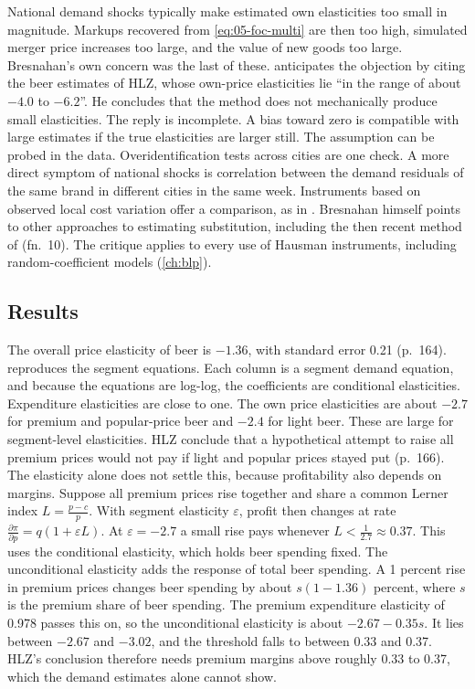 National demand shocks typically make estimated own elasticities too small in magnitude. Markups recovered from
\eqref{eq:05-foc-multi} are then too high, simulated merger price increases too large, and the value of new goods
too large. Bresnahan's own concern was the last of these. \citet[fn.~25]{Hausman1997} anticipates the objection
by citing the beer estimates of HLZ, whose own-price elasticities lie ``in the range of about $-4.0$ to $-6.2$''.
He concludes that the method does not mechanically produce small elasticities. The reply is incomplete. A bias
toward zero is compatible with large estimates if the true elasticities are larger still. The assumption can be
probed in the data. Overidentification tests across cities are one check. A more direct symptom of national
shocks is correlation between the demand residuals of the same brand in different cities in the same week.
Instruments based on observed local cost variation offer a comparison, as in \citet{Nevo2001}. Bresnahan
himself points to other approaches to estimating substitution, including the then recent method of
\citet{Berry1994} (fn.~10). The critique
applies to every use of Hausman instruments, including random-coefficient models (\cref{ch:blp}).

\subsection{Results}\label{sec:05-hlz-results}

The overall price elasticity of beer is $-1.36$, with standard error 0.21 (p.~164). 
reproduces the segment equations. Each column is a segment demand equation, and because the equations are
log-log, the coefficients are conditional elasticities. Expenditure elasticities are close to one. The own
price elasticities are about $-2.7$ for premium and popular-price beer and $-2.4$ for light beer. These are large
for segment-level elasticities. HLZ conclude that a hypothetical attempt to raise all premium prices would not pay
if light and popular prices stayed put (p.~166). The elasticity alone does not settle this, because profitability
also depends on margins. Suppose all premium prices rise together and share a common Lerner index $L = \frac{p -
c}{p}$. With segment elasticity $\varepsilon$, profit then changes at rate $\frac{\partial\pi}{\partial p} = q(1 +
\varepsilon L)$. At $\varepsilon = -2.7$ a small rise pays whenever $L < \frac{1}{2.7} \approx 0.37$. This uses the
conditional elasticity, which holds beer spending fixed. The unconditional elasticity adds the response of
total beer spending. A 1 percent rise in premium prices changes beer spending by about $s(1 - 1.36)$ percent,
where $s$ is the premium share of beer spending. The premium expenditure elasticity of 0.978 passes this on, so
the unconditional elasticity is about $-2.67 - 0.35s$. It lies between $-2.67$ and $-3.02$, and the threshold
falls to between 0.33 and 0.37. HLZ's conclusion therefore needs premium margins above roughly 0.33 to 0.37,
which the demand estimates alone cannot show.

